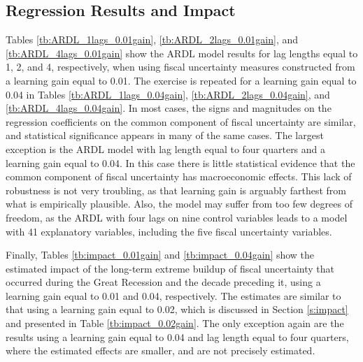 \documentclass[11pt]{article}
\begin{document}
\subsection{Regression Results and Impact}
Tables \ref{tb:ARDL_1lags_0.01gain}, \ref{tb:ARDL_2lags_0.01gain}, and \ref{tb:ARDL_4lags_0.01gain} show the ARDL model results for lag lengths equal to 1, 2, and 4, respectively, when using fiscal uncertainty measures constructed from a learning gain equal to 0.01.  The exercise is repeated for a learning gain equal to 0.04 in Tables \ref{tb:ARDL_1lags_0.04gain}, \ref{tb:ARDL_2lags_0.04gain}, and \ref{tb:ARDL_4lags_0.04gain}.  In most cases, the signs and magnitudes on the regression coefficients on the common component of fiscal uncertainty are similar, and statistical significance appears in many of the same cases.  The largest exception is the ARDL model with lag length equal to four quarters and a learning gain equal to 0.04.  In this case there is little statistical evidence that the common component of fiscal uncertainty has macroeconomic effects.  This lack of robustness is not very troubling, as that learning gain is arguably farthest from what is empirically plausible.  Also, the model may suffer from too few degrees of freedom, as the ARDL with four lags on nine control variables leads to a model with 41 explanatory variables, including the five fiscal uncertainty variables.

Finally, Tables \ref{tb:impact_0.01gain} and \ref{tb:impact_0.04gain} show the estimated impact of the long-term extreme buildup of fiscal uncertainty that occurred during the Great Recession and the decade preceding it, using a learning gain equal to 0.01 and 0.04, respectively.  The estimates are similar to that using a learning gain equal to 0.02, which is discussed in Section \ref{s:impact} and presented in Table \ref{tb:impact_0.02gain}.  The only exception again are the results using a learning gain equal to 0.04 and lag length equal to four quarters, where the estimated effects are smaller, and are not precisely estimated.

\ \\ \newpage

\renewcommand*\thetable{A\arabic{table}}
\setcounter{table}{0}
\end{document}
